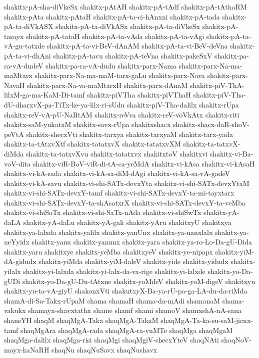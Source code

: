 {shakitx-pA-sha-diVkeSx
shakitx-pAtAH
shakitx-pA-tAdf
shakitx-pA-tAthaRM
shakitx-pAta
shakitx-pAtaH
shakitx-pA-ta-ci-hAnxni
shakitx-pA-tada
shakitx-pA-ta-diVkASX
shakitx-pA-ta-diVkASx
shakitx-pA-ta-diVkeSx
shakitx-pA-tasayx
shakitx-pA-tataH
shakitx-pA-ta-vAda
shakitx-pA-ta-vAgi
shakitx-pA-ta-vA-gu-tatxde
shakitx-pA-ta-vi-BeV-dAnAM
shakitx-pA-ta-vi-BeV-deVna
shakitx-pA-ta-vi-dhAni
shakitx-pA-tavu
shakitx-pA-teVna
shakitx-pakeSxV
shakitx-pa-ra-vA-dudeV
shakitx-pa-ra-vA-dudu
shakitx-parx-Nama
shakitx-parx-Na-ma-maMtarx
shakitx-parx-Na-ma-maM-tarx-gaLu
shakitx-parx-Nava
shakitx-parx-NavaH
shakitx-parx-Na-va-maMtarxH
shakitx-parx-dAnaM
shakitx-piV-ThA-lilxM-ga-ma-KaM-Di-tamf
shakitx-piVTha
shakitx-piVThaH
shakitx-piV-Tha-dU-dharxvX-pa-TiTx-ke-ya-lilx-ri-sUdu
shakitx-piV-Tha-dalilx
shakitx-rUpa
shakitx-reV-vA-pU-NaRtAM
shakitx-reVva
shakitx-reV-voVkAtx
shakitx-riti
shakitx-saM-yukatxM
shakitx-savx-rUpa
shakitxshacx
shakitx-shacx-daR-shoV-peVtA
shakitx-shecxVti
shakitx-tarxya
shakitx-tarxyaM
shakitx-tarx-yada
shakitx-ta-tAtxvXtf
shakitx-tatatxvX
shakitx-tatatxvXM
shakitx-ta-tatxvX-diMda
shakitx-ta-tatxvXvu
shakitx-tatatxvx
shakitxtoV
shakitxvi
shakitx-vi-Ba-voV-dita
shakitx-viR-BoV-viR-di-tA-ca-yeMdA
shakitx-vi-kAsa
shakitx-vi-kAsaH
shakitx-vi-kA-sada
shakitx-vi-kA-sa-diM-dAgi
shakitx-vi-kA-sa-vA-gadeV
shakitx-vi-kA-savu
shakitx-vi-shi-SATx-devxYta
shakitx-vi-shi-SATx-devxYtaM
shakitx-vi-shi-SATx-devxY-tamf
shakitx-vi-shi-SATx-devxY-ta-mi-tayxtarx
shakitx-vi-shi-SATx-devxY-ta-shAsatxrX
shakitx-vi-shi-SATx-devxY-ta-veMba
shakitx-vi-shiSaTx
shakitx-vi-shi-SaTx-nAda
shakitx-vi-shiSwTx
shakitx-yA-daLA
shakitx-yA-daLu
shakitx-yA-gali
shakitx-yAru
shakitxyU
shakitxya
shakitx-ya-lalxda
shakitx-yalilx
shakitx-yanUnx
shakitx-ya-nanxlalx
shakitx-ya-neYyidx
shakitx-yanu
shakitx-yanunx
shakitx-yara
shakitx-ya-ro-Lo-Da-gU-Dida
shakitx-yaru
shakitxye
shakitx-yeMba
shakitxyeV
shakitx-ye-nipapx
shakitx-yiM-dA-gidudx
shakitx-yiMda
shakitx-yiM-daleV
shakitx-yide
shakitx-yidudx
shakitx-yilalx
shakitx-yi-lalxda
shakitx-yi-lalx-da-va-rige
shakitx-yi-lalxde
shakitx-yo-Da-gUDi
shakitx-yo-Da-gU-Du-tAtxne
shakitx-yoMdeV
shakitx-yoM-digeV
shakitxyu
shakitx-yu-ta-vA-giyU
shakonxVti
shakutxyX-Ba-ya-rU-pa-ga-LA-du-da-riMda
shamA-di-Sa-Takx-rUpaM
shama
shamaH
shama-da-mAdi
shamanaM
shama-vakukx
shamayx-shavxtathx
shame
shamf
shami
shamoV
shamxshA-nA-sana
shaneYH
shaqM
shaqMgA-Taka
shaqMgA-TakaM
shaqMgA-Ta-ka-su-saM-jicnx-tamf
shaqMgAra
shaqMgA-rada
shaqMgA-ra-vuMTe
shaqMga
shaqMgaM
shaqMga-dalilx
shaqMga-risi
shaqMgi
shaqMgiV-shecxYteV
shaqNAti
shaqNoV-mayx-kaNaRH
shaqNu
shaqNuSavx
shaqNushavx
}

